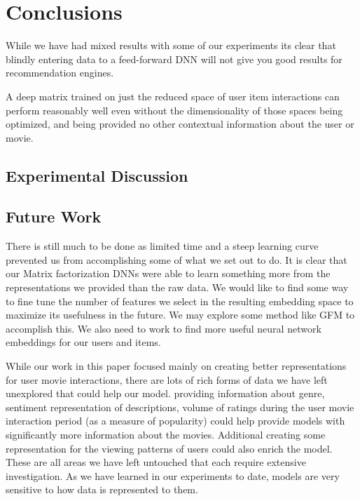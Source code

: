 \section{Conclusions}

While we have had mixed results with some of our experiments its clear that blindly entering data to a feed-forward DNN will not give you good results for recommendation engines.

A deep matrix trained on just the reduced space of user item interactions can perform reasonably well even without the dimensionality of those spaces being optimized, and being provided no other contextual information about the user or movie.

\subsection{Experimental Discussion}
\subsection{Future Work}

There is still much to be done as limited time and a steep learning curve prevented us from accomplishing some of what we set out to do. It is clear that our Matrix factorization DNNs were able to learn something more from the representations we provided than the raw data. We would like to find some way to fine tune the number of features we select in the resulting embedding space to maximize its usefulness in the future. We may explore some method like GFM to accomplish this. We also need to work to find more useful neural network embeddings for our users and items.

While our work in this paper focused mainly on creating better representations for user movie interactions, there are lots of rich forms of data we have left unexplored that could help our model. providing information about genre, sentiment representation of descriptions, volume of ratings during the user movie interaction period (as a measure of popularity) could help provide models with significantly more information about the movies. Additional creating some representation for the viewing patterns of users could also enrich the model. These are all areas we have left untouched that each require extensive investigation. As we have learned in our experiments to date, models are very sensitive to how data is represented to them.